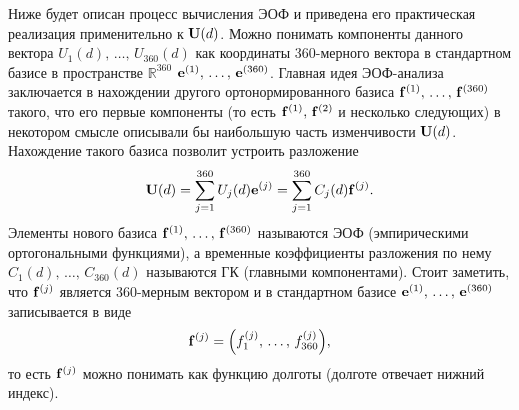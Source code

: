 Ниже будет описан процесс вычисления ЭОФ \cite[Гл. 6]{Zhang_Moore_2015} и приведена его практическая реализация применительно к $\vb{U}(d)$. Можно понимать компоненты данного вектора $U_1(d),\, \ldots,\, U_{360}(d)$ как координаты 360-мерного вектора в стандартном базисе в пространстве $\mathbb{R}^{360}$ $\vb{e}^{(1)},\, \ldots,\, \vb{e}^{(360)}$. Главная идея ЭОФ-анализа заключается в нахождении другого ортонормированного базиса $\vb{f}^{(1)},\, \ldots,\, \vb{f}^{(360)}$ такого, что его первые компоненты (то есть  $\vb{f}^{(1)},\, \vb{f}^{(2)}$ и несколько следующих) в некотором смысле описывали бы наибольшую часть изменчивости $\vb{U}(d)$. Нахождение такого базиса позволит устроить разложение
\begin{equation}
    \label{eq:decomp}
    \vb{U}(d) = \sum\limits_{j=1}^{360} U_j(d) \vb{e}^{(j)} = \sum\limits_{j=1}^{360} C_j(d) \vb{f}^{(j)}.
\end{equation}
Элементы нового базиса $\vb{f}^{(1)},\, \ldots,\, \vb{f}^{(360)}$ называются ЭОФ (эмпирическими ортогональными функциями), а временные коэффициенты разложения по нему $C_1(d),\, \ldots,\, C_{360}(d)$ называются ГК (главными компонентами). Стоит заметить, что $\vb{f}^{(j)}$ является 360-мерным вектором и в стандартном базисе $\vb{e}^{(1)},\, \ldots,\, \vb{e}^{(360)}$ записывается в виде
\begin{equation}
    \vb{f}^{(j)} = \qty({f}_1^{(j)},\, \ldots,\, {f}_{360}^{(j)}),
\end{equation}
то есть $\vb{f}^{(j)}$ можно понимать как функцию долготы (долготе отвечает нижний индекс).

